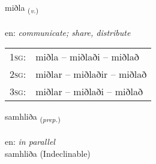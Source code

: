 \documentclass[frontgrid, backgrid]{flacards}\usepackage[]{graphicx}\usepackage[]{color}
\begin{document}
\renewcommand{\flhead}{\vskip5pt \fboxsep=0pt {\small\bfseries\footnotesize Sagnorð | Verb}}
\renewcommand{\fcfoot}{\vskip5pt \fboxsep=0pt \hspace{2pt}{\small\bfseries\footnotesize 2K}}

\renewcommand{\blhead}{\vskip5pt {\small\bfseries\footnotesize Sagnorð | Verb }}
\renewcommand{\bcfoot}{\vskip5pt \hspace{2pt}{\small\bfseries\footnotesize 2K}}


{miðla \small{\textsubscript{(\textit{v.})}} \\[1ex] %
\textphonetic{[mɪðla]} \\
en: \emph{communicate; share, distribute} \\  [2ex]
\renewcommand*{\arraystretch}{0.8}
\begin{tabular}{p{1cm}l}
\textsc{1sg}: & miðla -- miðlaði -- miðlað \\ 
\textsc{2sg}: & miðlar -- miðlaðir -- miðlað \\ 
\textsc{3sg}: & miðlar -- miðlaði -- miðlað \\ 
\end{tabular}
}


\renewcommand{\flhead}{\vskip5pt \fboxsep=0pt {\small\bfseries\footnotesize Forsetning | Preposition}}
\renewcommand{\fcfoot}{\vskip5pt \fboxsep=0pt \hspace{2pt}{\small\bfseries\footnotesize 2K}}

\renewcommand{\blhead}{\vskip5pt {\small\bfseries\footnotesize Forsetning | Preposition }}
\renewcommand{\bcfoot}{\vskip5pt \hspace{2pt}{\small\bfseries\footnotesize 2K}}


{samhliða \small{\textsubscript{(\textit{prep.})}} \\[1ex]
 \\
en: \emph{in parallel} \\  [2ex]
samhliða (Indeclinable)}
\end{document}
